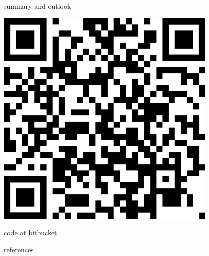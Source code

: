 \documentclass[svgnames,
               hyperref={colorlinks,citecolor=DeepPink4,linkcolor=FireBrick,urlcolor=Maroon},
               usepdftitle=false]  %
               {beamer}
\begin{document}
\begin{frame}{summary and outlook}
\begin{minipage}[T]{0.25\textwidth}
\hfill \includegraphics[width=0.8\textwidth]{figs/QRfascd.png}

\scriptsize \hfill code at bitbucket

\phantom{foo}
\end{minipage}
\end{frame}


\begin{frame}{references}

{\footnotesize

}
\end{frame}
\end{document}
